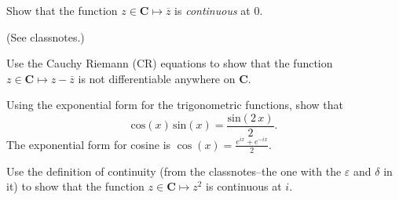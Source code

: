 \documentclass[fleqn,12pt]{exam}
\newcommand{\complex}{\mathbf{C}}
\newcommand{\imag}{\mathrm{i}}
\newcommand{\reals}{\mathbf{R}}
\begin{document}
\begin{questions}




\question  Show that the function \(z \in \complex \mapsto \overline{z}  \) is \emph{continuous} at 0.

\begin{solution} (See classnotes.)

\end{solution}







\question   Use the Cauchy Riemann (CR) equations to show that the function \(z \in \mathbf{C} \mapsto z - \overline{z}\)
is not differentiable anywhere on \(\mathbf{C}\). 
\begin{solution}%

\end{solution}




\question  Using the exponential form for the trigonometric functions, show that
\[ 
   \mathrm{cos}\left( x\right) \,\mathrm{sin}\left( x\right) =\frac{\mathrm{sin}\left( 2\,x\right) }{2}.
\]
The exponential form for cosine is \(\cos(x) = \frac{e^{i x} + e^{-i x}}{2}\).


\begin{solution}%
\end{solution}


\question Use the definition of continuity (from the classnotes--the one with the \(\varepsilon\) and \(\delta\) in it) 
to show that the function \(z \in \mathbf{C} \mapsto z^2\) is continuous at \(i\).

\begin{solution}%
\end{solution}


\end{questions}
\end{document}
